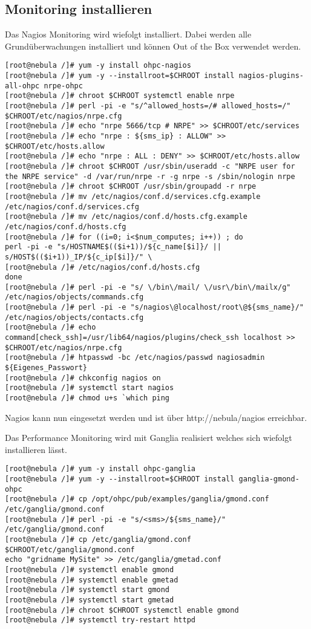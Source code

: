 \subsection{Monitoring installieren}

Das Nagios Monitoring wird wiefolgt installiert. Dabei werden alle Grundüberwachungen installiert und können Out of the Box verwendet werden.

\begin{lstlisting}
[root@nebula /]# yum -y install ohpc-nagios
[root@nebula /]# yum -y --installroot=$CHROOT install nagios-plugins-all-ohpc nrpe-ohpc
[root@nebula /]# chroot $CHROOT systemctl enable nrpe
[root@nebula /]# perl -pi -e "s/^allowed_hosts=/# allowed_hosts=/" $CHROOT/etc/nagios/nrpe.cfg
[root@nebula /]# echo "nrpe 5666/tcp # NRPE" >> $CHROOT/etc/services
[root@nebula /]# echo "nrpe : ${sms_ip} : ALLOW" >> $CHROOT/etc/hosts.allow
[root@nebula /]# echo "nrpe : ALL : DENY" >> $CHROOT/etc/hosts.allow
[root@nebula /]# chroot $CHROOT /usr/sbin/useradd -c "NRPE user for the NRPE service" -d /var/run/nrpe -r -g nrpe -s /sbin/nologin nrpe
[root@nebula /]# chroot $CHROOT /usr/sbin/groupadd -r nrpe
[root@nebula /]# mv /etc/nagios/conf.d/services.cfg.example /etc/nagios/conf.d/services.cfg
[root@nebula /]# mv /etc/nagios/conf.d/hosts.cfg.example /etc/nagios/conf.d/hosts.cfg
[root@nebula /]# for ((i=0; i<$num_computes; i++)) ; do
perl -pi -e "s/HOSTNAME$(($i+1))/${c_name[$i]}/ || s/HOST$(($i+1))_IP/${c_ip[$i]}/" \
[root@nebula /]# /etc/nagios/conf.d/hosts.cfg
done
[root@nebula /]# perl -pi -e "s/ \/bin\/mail/ \/usr\/bin\/mailx/g" /etc/nagios/objects/commands.cfg
[root@nebula /]# perl -pi -e "s/nagios\@localhost/root\@${sms_name}/" /etc/nagios/objects/contacts.cfg
[root@nebula /]# echo command[check_ssh]=/usr/lib64/nagios/plugins/check_ssh localhost >> $CHROOT/etc/nagios/nrpe.cfg
[root@nebula /]# htpasswd -bc /etc/nagios/passwd nagiosadmin ${Eigenes_Passwort}
[root@nebula /]# chkconfig nagios on
[root@nebula /]# systemctl start nagios
[root@nebula /]# chmod u+s `which ping
\end{lstlisting}

Nagios kann nun eingesetzt werden und ist über http://nebula/nagios erreichbar.

Das Performance Monitoring wird mit Ganglia realisiert welches sich wiefolgt installieren lässt.

\begin{lstlisting}
[root@nebula /]# yum -y install ohpc-ganglia
[root@nebula /]# yum -y --installroot=$CHROOT install ganglia-gmond-ohpc
[root@nebula /]# cp /opt/ohpc/pub/examples/ganglia/gmond.conf /etc/ganglia/gmond.conf
[root@nebula /]# perl -pi -e "s/<sms>/${sms_name}/" /etc/ganglia/gmond.conf
[root@nebula /]# cp /etc/ganglia/gmond.conf $CHROOT/etc/ganglia/gmond.conf
echo "gridname MySite" >> /etc/ganglia/gmetad.conf
[root@nebula /]# systemctl enable gmond
[root@nebula /]# systemctl enable gmetad
[root@nebula /]# systemctl start gmond
[root@nebula /]# systemctl start gmetad
[root@nebula /]# chroot $CHROOT systemctl enable gmond
[root@nebula /]# systemctl try-restart httpd
\end{lstlisting}

